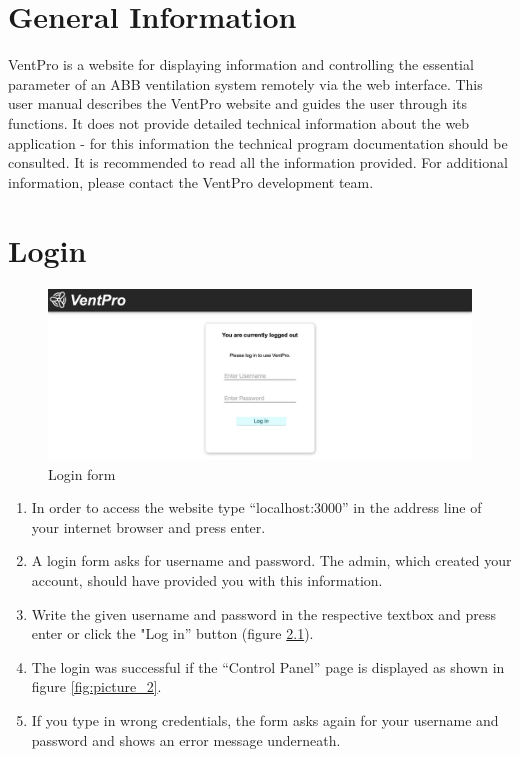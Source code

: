 \chapter{General Information}
\label{sec:general_information}
VentPro is a website for displaying information and controlling the essential parameter of an ABB ventilation system remotely via the web interface.
This user manual describes the VentPro website and guides the user through its functions. It does not provide detailed technical information about the web application - for this information the technical program documentation should be consulted. It is recommended to read all the information provided. For additional information, please contact the VentPro development team.\\



\chapter{Login}
\label{sec:login}

\begin{figure}[h]
\centering
\includegraphics[width=1.0\textwidth]{img/Picture1}
\caption{Login form}
\label{fig:picture_1}
\end{figure}
\vspace{0.3cm}

\begin{enumerate}[wide,  labelwidth=0.3cm,  labelindent=0pt, leftmargin=0.5cm]
\item In order to access the website type “localhost:3000” in the address line of your internet browser and press enter.
\item A login form asks for username and password. The admin, which created your account, should have provided you with this information.
\item Write the given username and password in the respective textbox and press enter or click the "Log in” button (figure \ref{fig:picture_1}).
\item The login was successful if the “Control Panel” page is displayed as shown in figure \ref{fig:picture_2}.
\item If you type in wrong credentials, the form asks again for your username and password and shows an error message underneath.
\end{enumerate}

